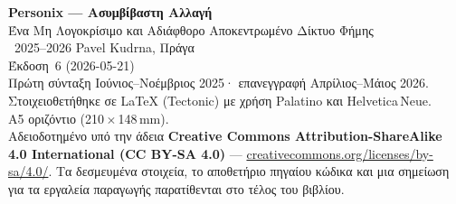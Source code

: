 \thispagestyle{empty}
\ifdefined\printmode\vspace*{\fill}\else{}\fi
\begin{flushleft}\small\sffamily
\textbf{Personix --- Ασυμβίβαστη Αλλαγή}\\[0.3em]
Ένα Μη Λογοκρίσιμο και Αδιάφθορο Αποκεντρωμένο Δίκτυο Φήμης\\[1.4em]

\textcopyright\ 2025--2026 Pavel Kudrna, Πράγα\\[0.4em]

Έκδοση~6 (2026-05-21)\\
Πρώτη σύνταξη Ιούνιος--Νοέμβριος 2025· επανεγγραφή Απρίλιος--Μάιος 2026.\\[1.4em]

Στοιχειοθετήθηκε σε \LaTeX{} (Tectonic) με χρήση Palatino και Helvetica\,Neue.\\
A5 οριζόντιο (210\,$\times$\,148\,mm).\\[1.4em]

Αδειοδοτημένο υπό την άδεια \textbf{Creative Commons Attribution-ShareAlike 4.0
International (CC BY-SA 4.0)} ---
\href{https://creativecommons.org/licenses/by-sa/4.0/}{creativecommons.org/licenses/by-sa/4.0/}.
Τα δεσμευμένα στοιχεία, το αποθετήριο πηγαίου κώδικα και μια σημείωση για τα
εργαλεία παραγωγής παρατίθενται στο τέλος του βιβλίου.
\end{flushleft}
\ifdefined\printmode\else{}\fi
\clearpage
